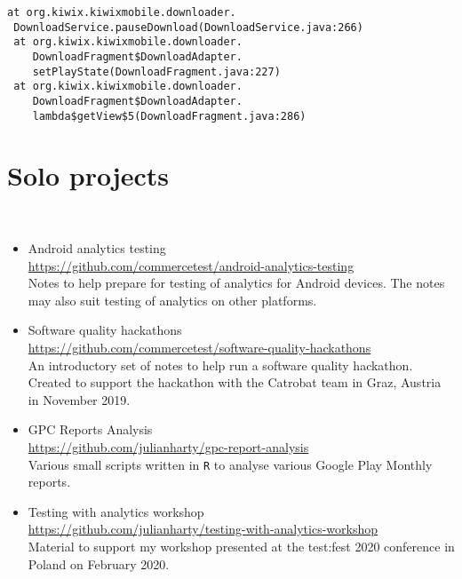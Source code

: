 \begin{lstlisting}[caption=Example of lines to match,label=listing:codelines]
at org.kiwix.kiwixmobile.downloader.
 DownloadService.pauseDownload(DownloadService.java:266)
 at org.kiwix.kiwixmobile.downloader.
    DownloadFragment$DownloadAdapter.
    setPlayState(DownloadFragment.java:227)
 at org.kiwix.kiwixmobile.downloader.
    DownloadFragment$DownloadAdapter.
    lambda$getView$5(DownloadFragment.java:286)
\end{lstlisting}


\section{Solo projects}~\label{sec:solo-projects}
\begin{itemize}
    \item Android analytics testing\\ \url{https://github.com/commercetest/android-analytics-testing}\\ Notes to help prepare for testing of analytics for Android devices. The notes may also suit testing of analytics on other platforms.

    \item Software quality hackathons\\ \url{https://github.com/commercetest/software-quality-hackathons}\\ An introductory set of notes to help run a software quality hackathon. Created to support the hackathon with the Catrobat team in Graz, Austria in November 2019. 
    \item GPC Reports Analysis\\ \url{https://github.com/julianharty/gpc-report-analysis}\\ Various small scripts written in \texttt{R} to analyse various Google Play Monthly reports.
    
    \item Testing with analytics workshop\\ \url{https://github.com/julianharty/testing-with-analytics-workshop}\\ Material to support my workshop presented at the test:fest 2020 conference in Poland on  February 2020.
\end{itemize}

